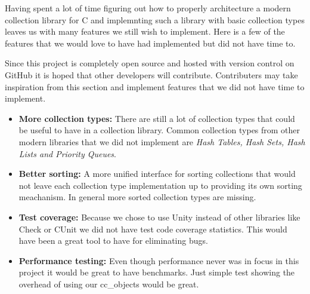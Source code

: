 \documentclass[table]{ituthesis}
\begin{document}
			Having spent a lot of time figuring out how to properly architecture a modern collection library for C and implemnting such a library with basic collection types leaves us with many features we still wish to implement. Here is a few of the features that we would love to have had implemented but did not have time to.
			
			Since this project is completely open source and hosted with version control on GitHub it is hoped that other developers will contribute. Contributers may take inspiration from this section and implement features that we did not have time to implement.
			
			\begin{itemize}
				\item \textbf{More collection types:} There are still a lot of collection types that could be useful to have in a collection library. Common collection types from other modern libraries that we did not implement are \textit{Hash Tables, Hash Sets, Hash Lists and Priority Queues}.
				\item \textbf{Better sorting:} A more unified interface for sorting collections that would not leave each collection type implementation up to providing its own sorting meachanism. In general more sorted collection types are missing.
				\item \textbf{Test coverage:} Because we chose to use Unity instead of other libraries like Check or CUnit we did not have test code coverage statistics. This would have been a great tool to have for eliminating bugs.
				\item \textbf{Performance testing:} Even though performance never was in focus in this project it would be great to have benchmarks. Just simple test showing the overhead of using our cc\_objects would be great.
			\end{itemize}

\end{document}
